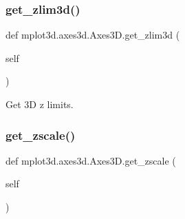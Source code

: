 \subsubsection{\texorpdfstring{get\+\_\+zlim3d()}{get\_zlim3d()}}
{\footnotesize\ttfamily def mplot3d.\+axes3d.\+Axes3\+D.\+get\+\_\+zlim3d (\begin{DoxyParamCaption}\item[{}]{self }\end{DoxyParamCaption})}

\begin{DoxyVerb}Get 3D z limits.\end{DoxyVerb}
 \mbox{\label{classmplot3d_1_1axes3d_1_1Axes3D_a0c6d8fc64e7941c89fcbee4ed92f1dd1}} 
\subsubsection{\texorpdfstring{get\+\_\+zscale()}{get\_zscale()}}
{\footnotesize\ttfamily def mplot3d.\+axes3d.\+Axes3\+D.\+get\+\_\+zscale (\begin{DoxyParamCaption}\item[{}]{self }\end{DoxyParamCaption})}


